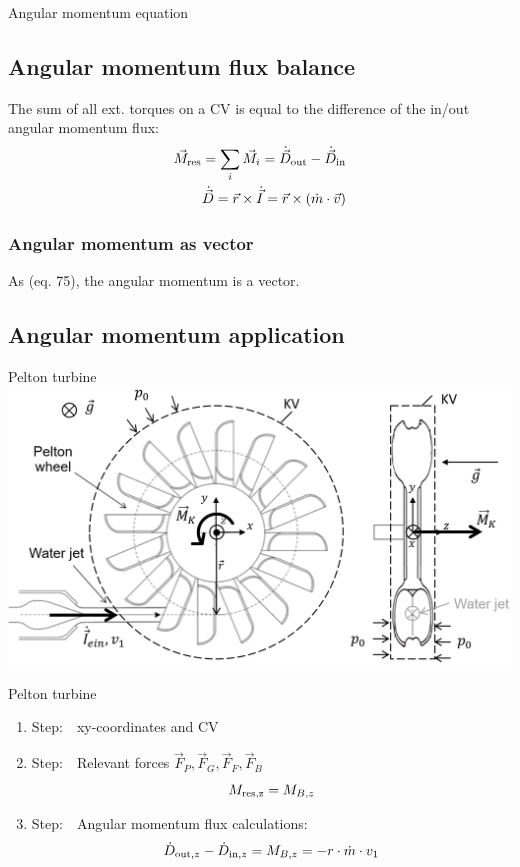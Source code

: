 \documentclass{article}
\begin{document}
\begin{multicols}{2}
\begin{theorybox}{Angular momentum equation}
    \subsection{Angular momentum flux balance}
    The sum of all ext. torques on a CV is equal
    to the difference of the in/out angular momentum flux:
    \vspace*{-0.3cm}
    \begin{align}
        \vec{M}_{\rm res} = \sum_i \vec{M}_i = \dot{\vec{D}}_{\rm out} - \dot{\vec{D}}_{\rm in}\\
        \dot{\vec{D}} = \vec{r} \times \dot{\vec{I}} = \vec{r} \times \left(\dot{m}\cdot \vec{v}\right)
    \end{align}

    \subsubsection{Angular momentum as vector}
    As (eq. 75), the angular momentum is a vector.
\end{theorybox}

\subsection{Angular momentum application}
\begin{examplebox}{Pelton turbine}
    \includegraphics[width=\textwidth]{media/peltonlaufrad_drall_en.png}
\end{examplebox}
\vfill
\columnbreak

\begin{examplebox}{Pelton turbine}
        \begin{enumerate}[label=\Roman*]
        \item Step:\ \ xy-coordinates and CV
        \item Step:\ \ Relevant forces $\vec{F}_P,\vec{F}_G,\vec{F}_F,\vec{F}_B$
            \begin{equation}
                M_{\rm res,z} = M_{B,z}
            \end{equation}
        \item Step:\ \ Angular momentum flux calculations:
            \begin{equation}
                \dot{D}_{{\rm out},z} - \dot{D}_{{\rm in},z} = M_{B,z} = -r\cdot \dot{m} \cdot v_1
            \end{equation}
    \end{enumerate}


\end{examplebox}
\end{multicols}
\end{document}
